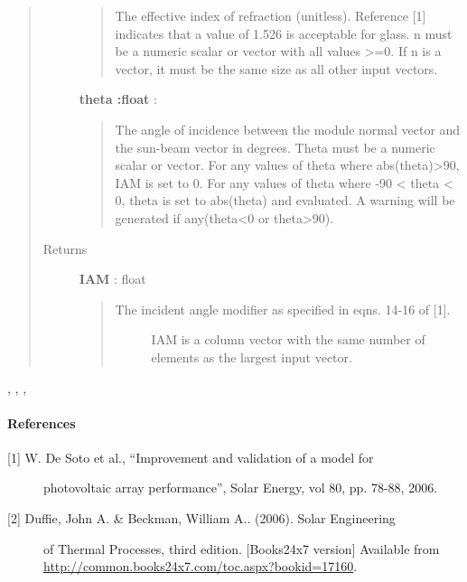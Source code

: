 \documentclass[letterpaper,10pt,english]{sphinxmanual}
\begin{document}
\begin{fulllineitems}
\begin{quote}
\begin{description}
\begin{quote}
The effective index of refraction (unitless). Reference {[}1{]}
indicates that a value of 1.526 is acceptable for glass. n must be a 
numeric scalar or vector with all values \textgreater{}=0. If n is a vector, it 
must be the same size as all other input vectors.
\end{quote}

\textbf{theta :float} :
\begin{quote}

The angle of incidence between the module normal vector and the
sun-beam vector in degrees. Theta must be a numeric scalar or vector.
For any values of theta where abs(theta)\textgreater{}90, IAM is set to 0. For any
values of theta where -90 \textless{} theta \textless{} 0, theta is set to abs(theta) and
evaluated. A warning will be generated if any(theta\textless{}0 or theta\textgreater{}90).
\end{quote}

\item[{Returns}] \leavevmode
\textbf{IAM} : float
\begin{quote}
\begin{description}
\item[{The incident angle modifier as specified in eqns. 14-16 of {[}1{]}.}] \leavevmode
IAM is a column vector with the same number of elements as the
largest input vector.

\end{description}
\end{quote}

\end{description}\end{quote}




{\hyperref[stubs/pvlib.pvl_getaoi:pvlib.pvl_getaoi]{}}, {\hyperref[stubs/pvlib.pvl_ephemeris:pvlib.pvl_ephemeris]{}}, {\hyperref[stubs/pvlib.pvl_spa:pvlib.pvl_spa]{}}, {\hyperref[stubs/pvlib.pvl_ashraeiam:pvlib.pvl_ashraeiam]{}}


\paragraph{References}
\begin{description}
\item[{{[}1{]} W. De Soto et al., ``Improvement and validation of a model for}] \leavevmode
photovoltaic array performance'', Solar Energy, vol 80, pp. 78-88,
2006.

\item[{{[}2{]} Duffie, John A. \& Beckman, William A.. (2006). Solar Engineering }] \leavevmode
of Thermal Processes, third edition. {[}Books24x7 version{]} Available 
from \href{http://common.books24x7.com/toc.aspx?bookid=17160}{http://common.books24x7.com/toc.aspx?bookid=17160}.

\end{description}

\end{fulllineitems}
\end{document}
